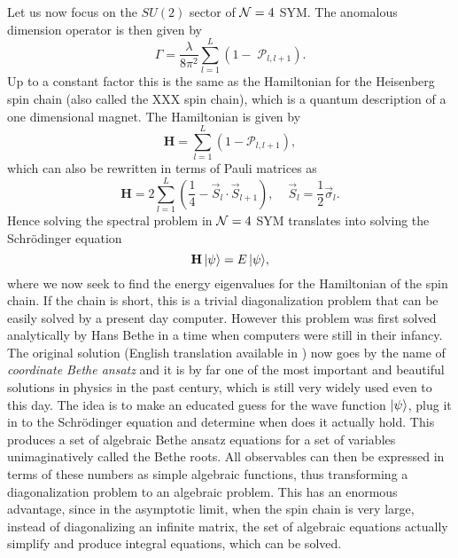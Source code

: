 Let us now focus on the $SU(2)$ sector of $\mathcal{N}=4$ SYM. The anomalous dimension operator is then given by
\begin{equation}
	\Gamma = \frac{\lambda}{8\pi^2}\sum_{l=1}^L \left(1 - \; \mathcal{P}_{l,l+1} \right).
\end{equation}
Up to a constant factor this is the same as the Hamiltonian for the Heisenberg spin chain (also called the XXX spin chain), which is a quantum description of a one dimensional magnet. The Hamiltonian is given by
\begin{equation}
	\mathbf{H} = \sum_{l=1}^L \left(1 - \mathcal{P}_{l,l+1} \right),
\end{equation}
which can also be rewritten in terms of Pauli matrices as
\begin{equation}
	\mathbf{H} = 2 \sum_{l=1}^L \left( \frac{1}{4} - \vec{S}_l \cdot \vec{S}_{l+1} \right), \;\;\;\; \vec{S}_l = \frac{1}{2} \vec{\sigma}_l.
\end{equation}
Hence solving the spectral problem in $\mathcal{N}=4$ SYM translates into solving the Schr\"{o}dinger equation
\begin{equation}
	\mathbf{H} \, |\psi\rangle = E \, |\psi\rangle,
	\label{eq:Schrodinger}
\end{equation}
where we now seek to find the energy eigenvalues for the Hamiltonian of the spin chain. If the chain is short, this is a trivial diagonalization problem that can be easily solved by a present day computer. However this problem was first solved analytically by Hans Bethe in a time when computers were still in their infancy. The original solution (English translation available in \cite{bethe_original}) now goes by the name of \emph{coordinate Bethe ansatz} and it is by far one of the most important and beautiful solutions in physics in the past century, which is still very widely used even to this day. The idea is to make an educated guess for the wave function $|\psi\rangle$, plug it in to the Schr\"{o}dinger equation and determine when does it actually hold. This produces a set of algebraic Bethe ansatz equations for a set of variables unimaginatively called the Bethe roots. All observables can then be expressed in terms of these numbers as simple algebraic functions, thus transforming a diagonalization problem to an algebraic problem. This has an enormous advantage, since in the asymptotic limit, when the spin chain is very large, instead of diagonalizing an infinite matrix, the set of algebraic equations actually simplify and produce integral equations, which can be solved.

